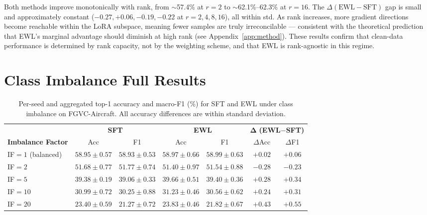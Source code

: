 Both methods improve monotonically with rank, from $\sim$57.4\% at $r{=}2$
to $\sim$62.1\%--62.3\% at $r{=}16$.
The $\Delta(\text{EWL}-\text{SFT})$ gap is small and approximately constant
($-0.27, +0.06, -0.19, -0.22$ at $r{=}2,4,8,16$), all within std.
As rank increases, more gradient directions become reachable within the LoRA
subspace, meaning fewer samples are truly irreconcilable --- consistent with
the theoretical prediction that EWL's marginal advantage should diminish at
high rank (see Appendix~\ref{app:method}).
These results confirm that clean-data performance is determined by rank
capacity, not by the weighting scheme, and that EWL is rank-agnostic in this
regime.

\section{Class Imbalance Full Results}
\label{app:imbalance}

\begin{table}[h]
  \centering
  \caption{
    Per-seed and aggregated top-1 accuracy and macro-F1 (\%) for SFT and EWL
    under class imbalance on FGVC-Aircraft.
    All accuracy differences are within standard deviation.
  }
  \label{tab:imbalance_full}
  \setlength{\tabcolsep}{4pt}
  \begin{tabular}{lcccccc}
    \toprule
    & \multicolumn{2}{c}{\textbf{SFT}} & \multicolumn{2}{c}{\textbf{EWL}} & \multicolumn{2}{c}{$\boldsymbol{\Delta}$ \textbf{(EWL$-$SFT)}} \\
    \cmidrule(lr){2-3}\cmidrule(lr){4-5}\cmidrule(lr){6-7}
    \textbf{Imbalance Factor} & Acc & F1 & Acc & F1 & $\Delta$Acc & $\Delta$F1 \\
    \midrule
    IF$=1$ (balanced) & $58.95{\pm}0.57$ & $58.93{\pm}0.53$ & $58.97{\pm}0.66$ & $58.99{\pm}0.63$ & $+0.02$ & $+0.06$ \\
    IF$=2$            & $51.68{\pm}0.77$ & $51.77{\pm}0.74$ & $51.40{\pm}0.97$ & $51.54{\pm}0.88$ & $-0.28$ & $-0.23$ \\
    IF$=5$            & $39.38{\pm}0.19$ & $39.06{\pm}0.33$ & $39.66{\pm}0.51$ & $39.40{\pm}0.36$ & $+0.28$ & $+0.34$ \\
    IF$=10$           & $30.99{\pm}0.72$ & $30.25{\pm}0.88$ & $31.23{\pm}0.46$ & $30.56{\pm}0.62$ & $+0.24$ & $+0.31$ \\
    IF$=20$           & $23.40{\pm}0.59$ & $21.27{\pm}0.72$ & $23.83{\pm}0.46$ & $21.82{\pm}0.67$ & $+0.43$ & $+0.55$ \\
    \bottomrule
  \end{tabular}
\end{table}


